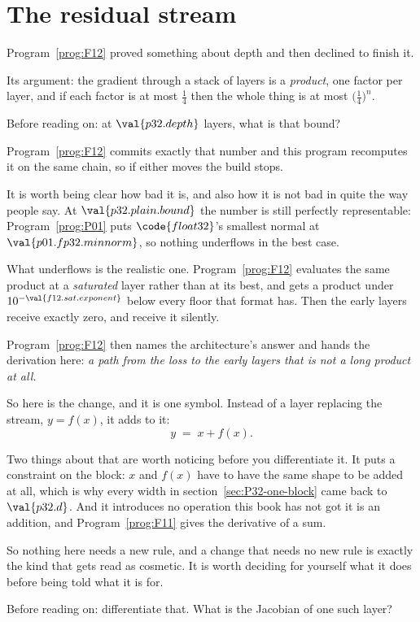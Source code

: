 \section{The residual stream}
\label{sec:P32-residual}

\begin{fr}
Program~\ref{prog:F12} proved something about depth and then declined to
finish it.

Its argument: the gradient through a stack of layers is a \emph{product},
one factor per layer, and if each factor is at most $\frac{1}{4}$ then the
whole thing is at most $\bigl(\frac{1}{4}\bigr)^{n}$.

Before reading on: at $\val{p32.depth}$ layers, what is that bound?
\dotline
\nextframe
\end{fr}

\begin{fr}

Program~\ref{prog:F12} commits exactly that number and this program
recomputes it on the same chain, so if either moves the build stops.

It is worth being clear how bad it is, and also how it is not bad in quite
the way people say. At $\val{p32.plain.bound}$ the number is still perfectly
representable: Program~\ref{prog:P01} puts $\code{float32}$'s smallest normal
at $\val{p01.fp32.minnorm}$, so nothing underflows in the best case.

What underflows is the realistic one. Program~\ref{prog:F12} evaluates the
same product at a \emph{saturated} layer rather than at its best, and gets a
product under $10^{-\val{f12.sat.exponent}}$ \dash{} below every floor that
format has. Then the early layers receive exactly zero, and receive it
silently.

Program~\ref{prog:F12} then names the architecture's answer and hands the
derivation here: \emph{a path from the loss to the early layers that is not
a long product at all.}

So here is the change, and it is one symbol. Instead of a layer replacing
the stream, $y = f(x)$, it adds to it:
\[ y \;=\; x + f(x). \]

Two things about that are worth noticing before you differentiate it. It puts
a constraint on the block: $x$ and $f(x)$ have to have the same shape to be
added at all, which is why every width in
section~\ref{sec:P32-one-block} came back to $\val{p32.d}$. And it introduces
no operation this book has not got \dash{} it is an addition, and
Program~\ref{prog:F11} gives the derivative of a sum.

So nothing here needs a new rule, and a change that needs no new rule is
exactly the kind that gets read as cosmetic. It is worth deciding for yourself
what it does before being told what it is for.

Before reading on: differentiate that. What is the Jacobian of one such
layer?
\dotline
\nextframe
\end{fr}

